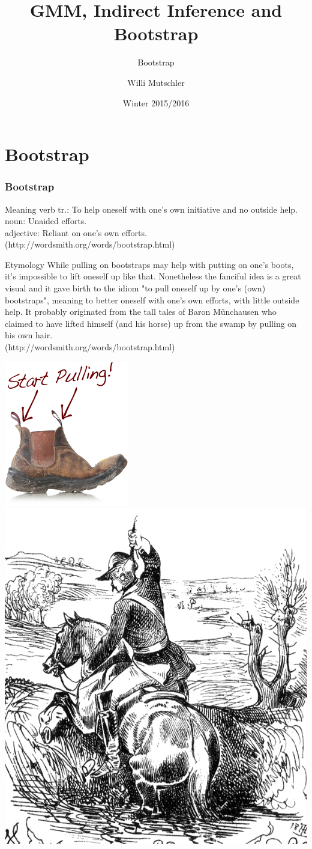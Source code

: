 \documentclass[smaller,compress]{beamer}
\begin{document}
\title{GMM, Indirect Inference and Bootstrap}
\subtitle{Bootstrap}
\author[Willi Mutschler]{Willi Mutschler}
\date{Winter 2015/2016}
\maketitle

\section{Bootstrap}


\begin{frame}\frametitle{Bootstrap}\small
\begin{block}{Meaning}\scriptsize
verb tr.: To help oneself with one's own initiative and no outside help.\\
noun: Unaided efforts.\\
adjective: Reliant on one's own efforts.\\
\scriptsize (http://wordsmith.org/words/bootstrap.html)
\end{block}
\begin{block}{Etymology}\scriptsize
While pulling on bootstraps may help with putting on one's boots, it's impossible to lift oneself up like that. Nonetheless the fanciful idea is a great visual and it gave birth to the idiom "to pull oneself up by one's (own) bootstraps", meaning to better oneself with one's own efforts, with little outside help. It probably originated from the tall tales of Baron M\"unchausen who claimed to have lifted himself (and his horse) up from the swamp by pulling on his own hair.\\
\scriptsize (http://wordsmith.org/words/bootstrap.html)
\end{block}
\begin{center}
    \includegraphics[width=.2\textwidth]{pics/boots.png}
    \includegraphics[width=.2\textwidth]{pics/munchhausen.jpg}
\end{center}
\end{frame}
\end{document}
